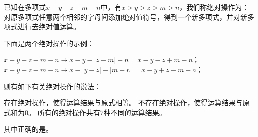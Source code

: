 \documentclass[10pt]{article}
\begin{document}
\begin{questions}{\selectingintroduction}
    \question %
    \question %
    \question %
    \question %
    \question %
    \question %
    \question %
    \question %
    \question %
    \question %
\end{questions}
\begin{questions}{\complitingintroduction}
    \question %
    \question %
    \question %
    \question %
    \question %
    \question 已知在多项式$x-y-z-m-n$中，有$x>y>z>m>n$，我们称{\kaishu 绝对操作}为：对原多项式任意两个相邻的字母间添加绝对值符号，得到一个新多项式，并对新多项式进行去绝对值运算。\par
    下面是两个{\kaishu 绝对操作}的示例：
    \begin{subsubquestions}
        \subsubquestion $x-y-z-m-n \rightarrow x-y-|z-m|-n = x-y-z+m-n$；
        \subsubquestion $x-y-z-m-n \rightarrow x-|y-z|-|m-n| = x-y+z-m+n$；
    \end{subsubquestions}
    则有如下有关{\kaishu 绝对操作}的说法：
    \begin{subsubquestions}\setcounter{subsubtaskcounter}{0}
        \subsubquestion 存在{\kaishu 绝对操作}，使得运算结果与原式相等。
        \subsubquestion 不存在{\kaishu 绝对操作}，使得运算结果与原式和为$0$。
        \subsubquestion 所有的{\kaishu 绝对操作}共有$7$种不同的运算结果。
    \end{subsubquestions}
    其中正确的是\complitingline\complitingline。
\end{questions}
\end{document}
